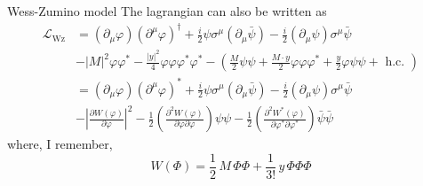 \documentclass[10pt]{beamer}
\begin{document}
\begin{frame}{Wess-Zumino model}
    The lagrangian can also be written as
    \begin{equation*}
        \begin{aligned}
            \mathcal{L}_{\mathrm{Wz}} &=\left(\partial_{\mu} \varphi\right)\left(\partial^{\mu} \varphi\right)^{\dagger}+\frac{i}{2} \psi \sigma^{\mu}\left(\partial_{\mu} \bar{\psi}\right)-\frac{i}{2}\left(\partial_{\mu} \psi\right) \sigma^{\mu} \bar{\psi} \\
            &-|M|^{2} \varphi \varphi^*-\frac{|y|^{2}}{4} \varphi \varphi \varphi^* \varphi^*-\left(\frac{M}{2} \psi \psi+\frac{M \cdot y}{2} \varphi \varphi \varphi^*+\frac{y}{2} \varphi \psi \psi+\text { h.c. }\right) \\
            &=\left(\partial_{\mu} \varphi\right)\left(\partial^{\mu} \varphi\right)^{*}+\frac{i}{2} \psi \sigma^{\mu}\left(\partial_{\mu} \bar{\psi}\right)-\frac{i}{2}\left(\partial_{\mu} \psi\right) \sigma^{\mu} \bar{\psi} \\
            &-\left|\frac{\partial W\left(\varphi\right)}{\partial \varphi}\right|^{2}-\frac{1}{2}\left(\frac{\partial^{2} W\left(\varphi\right)}{\partial \varphi \partial \varphi}\right) \psi \psi-\frac{1}{2}\left(\frac{\partial^{2} W^{*}\left(\varphi\right)}{\partial \varphi^{*} \partial \varphi^{*}}\right) \bar{\psi} \bar{\psi}
        \end{aligned}
    \end{equation*}
    where, I remember,
    \begin{equation*}
        W(\Phi) = \frac{1}{2} \, M \, \Phi\Phi + \frac{1}{3!} \, y \, \Phi\Phi\Phi
    \end{equation*}
\end{frame}
\end{document}
